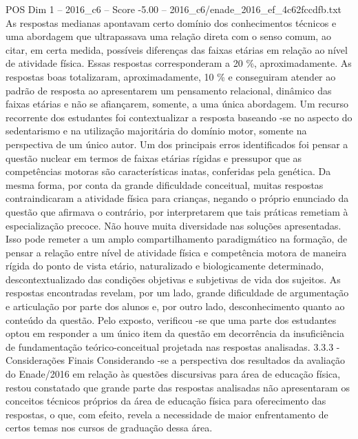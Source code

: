 \begin{textsample}{POS Dim 1 – 2016\_c6 – Score -5.00 – 2016\_c6/enade\_2016\_ef\_4c62fccdfb.txt}
As respostas medianas apontavam certo domínio dos conhecimentos técnicos e uma abordagem que ultrapassava uma relação direta com o senso comum, ao citar, em certa medida, possíveis diferenças das faixas etárias em relação ao nível de atividade física.
Essas respostas corresponderam a 20 \%, aproximadamente.
As respostas boas totalizaram, aproximadamente, 10 \% e conseguiram atender ao padrão de resposta ao apresentarem um pensamento relacional, dinâmico das faixas etárias e não se afiançarem, somente, a uma única abordagem.
Um recurso recorrente dos estudantes foi contextualizar a resposta baseando -se no aspecto do sedentarismo e na utilização majoritária do domínio motor, somente na perspectiva de um único autor.
Um dos principais erros identificados foi pensar a questão nuclear em termos de faixas etárias rígidas e pressupor que as competências motoras são características inatas, conferidas pela genética.
Da mesma forma, por conta da grande dificuldade conceitual, muitas respostas contraindicaram a atividade física para crianças, negando o próprio enunciado da questão que afirmava o contrário, por interpretarem que tais práticas remetiam à especialização precoce.
Não houve muita diversidade nas soluções apresentadas.
Isso pode remeter a um amplo compartilhamento paradigmático na formação, de pensar a relação entre nível de atividade física e competência motora de maneira rígida do ponto de vista etário, naturalizado e biologicamente determinado, descontextualizado das condições objetivas e subjetivas de vida dos sujeitos.
As respostas encontradas revelam, por um lado, grande dificuldade de argumentação e articulação por parte dos alunos e, por outro lado, desconhecimento quanto ao conteúdo da questão.
Pelo exposto, verificou -se que uma parte dos estudantes optou em responder a um único item da questão em decorrência da insuficiência de fundamentação teórico-conceitual projetada nas respostas analisadas. 3.3.3 - Considerações Finais Considerando -se a perspectiva dos resultados da avaliação do Enade/2016 em relação às questões discursivas para área de educação física, restou constatado que grande parte das respostas analisadas não apresentaram os conceitos técnicos próprios da área de educação física para oferecimento das respostas, o que, com efeito, revela a necessidade de maior enfrentamento de certos temas nos cursos de graduação dessa área.

\end{textsample}
